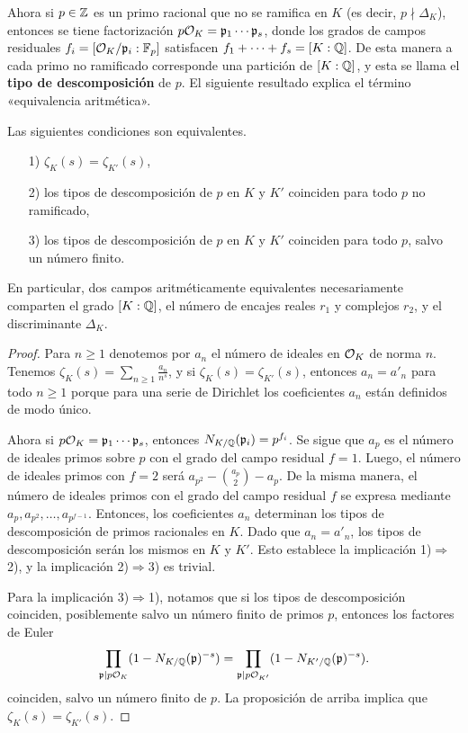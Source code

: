 Ahora si $p\in \mathbb{Z}$ es un primo racional que no se ramifica en $K$ (es decir,
$p\nmid \Delta_K$), entonces se tiene factorización
$p\mathcal{O}_K = \mathfrak{p}_1 \cdots \mathfrak{p}_s$, donde los grados de campos
residuales $f_i = [\mathcal{O}_K/\mathfrak{p}_i : \mathbb{F}_p]$ satisfacen
$f_1 + \cdots + f_s = [K : \mathbb{Q}]$. De esta manera a cada primo no ramificado
corresponde una partición de $[K : \mathbb{Q}]$, y esta se llama el
\textbf{tipo de descomposición} de $p$. El siguiente resultado explica el
término «equivalencia aritmética».

\begin{teorema}
  Las siguientes condiciones son equivalentes.
  \begin{enumerate}
  \item[1)] $\zeta_K (s) = \zeta_{K'} (s)$,

  \item[2)] los tipos de descomposición de $p$ en $K$ y $K'$ coinciden para todo
    $p$ no ramificado,

  \item[3)] los tipos de descomposición de $p$ en $K$ y $K'$ coinciden para todo
    $p$, salvo un número finito.
  \end{enumerate}

  En particular, dos campos aritméticamente equivalentes necesariamente
  comparten el grado $[K : \mathbb{Q}]$, el número de encajes reales $r_1$ y complejos
  $r_2$, y el discriminante $\Delta_K$.

  \begin{proof}
    Para $n \ge 1$ denotemos por $a_n$ el número de ideales en $\mathcal{O}_K$ de norma
    $n$. Tenemos $\zeta_K (s) = \sum_{n\ge 1} \frac{a_n}{n^s}$, y si
    $\zeta_K (s) = \zeta_{K'} (s)$, entonces $a_n = a'_n$ para todo $n \ge 1$
    porque para una serie de Dirichlet los coeficientes $a_n$ están definidos de
    modo único.

    Ahora si $p\mathcal{O}_K = \mathfrak{p}_1\cdots \mathfrak{p}_s$, entonces
    $N_{K/\mathbb{Q}} (\mathfrak{p}_i) = p^{f_i}$. Se sigue que $a_p$ es el número de
    ideales primos sobre $p$ con el grado del campo residual $f = 1$.
    Luego, el número de ideales primos con $f = 2$ será
    $a_{p^2} - {a_p \choose 2} - a_p$.  De la misma manera, el número de ideales
    primos con el grado del campo residual $f$ se expresa mediante
    $a_p, a_{p^2}, \ldots, a_{p^{f-1}}$. Entonces, los coeficientes $a_n$
    determinan los tipos de descomposición de primos racionales en $K$.  Dado
    que $a_n = a'_n$, los tipos de descomposición serán los mismos en $K$ y
    $K'$. Esto establece la implicación 1)$\Rightarrow $2), y la implicación
    2)$\Rightarrow$3) es trivial.

    Para la implicación 3)$\Rightarrow$1), notamos que si los tipos de
    descomposición coinciden, posiblemente salvo un número finito de primos $p$,
    entonces los factores de Euler
    \[ \prod_{\mathfrak{p} \mid p\mathcal{O}_K} (1 - N_{K/\mathbb{Q}} (\mathfrak{p})^{-s}) =
      \prod_{\mathfrak{p} \mid p\mathcal{O}_{K'}} (1 - N_{K'/\mathbb{Q}} (\mathfrak{p})^{-s}). \]
    coinciden, salvo un número finito de $p$. La proposición de arriba implica
    que $\zeta_K (s) = \zeta_{K'} (s)$.
  \end{proof}
\end{teorema}

